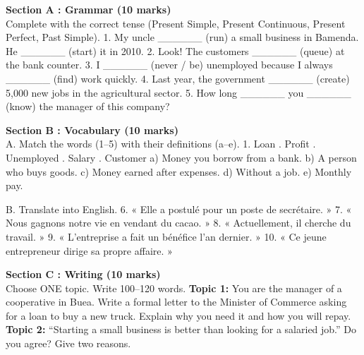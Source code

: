 \documentclass[11pt]{article}
\begin{document}
\begin{exercice}
\textbf{Section A : Grammar (10 marks)} \\
Complete with the correct tense (Present Simple, Present Continuous, Present Perfect, Past Simple).
1. My uncle \_\_\_\_\_\_ (run) a small business in Bamenda. He \_\_\_\_\_\_ (start) it in 2010.
2. Look! The customers \_\_\_\_\_\_ (queue) at the bank counter.
3. I \_\_\_\_\_\_ (never / be) unemployed because I always \_\_\_\_\_\_ (find) work quickly.
4. Last year, the government \_\_\_\_\_\_ (create) 5,000 new jobs in the agricultural sector.
5. How long \_\_\_\_\_\_ you \_\_\_\_\_\_ (know) the manager of this company?

\textbf{Section B : Vocabulary (10 marks)} \\
A. Match the words (1--5) with their definitions (a--e).
1. Loan . Profit . Unemployed . Salary . Customer
a) Money you borrow from a bank. \quad b) A person who buys goods. \quad c) Money earned after expenses. \quad d) Without a job. \quad e) Monthly pay.

B. Translate into English.
6. « Elle a postulé pour un poste de secrétaire. »
7. « Nous gagnons notre vie en vendant du cacao. »
8. « Actuellement, il cherche du travail. »
9. « L'entreprise a fait un bénéfice l'an dernier. »
10. « Ce jeune entrepreneur dirige sa propre affaire. »

\textbf{Section C : Writing (10 marks)} \\
Choose ONE topic. Write 100--120 words.
\textbf{Topic 1:} You are the manager of a cooperative in Buea. Write a formal letter to the Minister of Commerce asking for a loan to buy a new truck. Explain why you need it and how you will repay.
\textbf{Topic 2:} “Starting a small business is better than looking for a salaried job.” Do you agree? Give two reasons.
\end{exercice}
\end{document}
